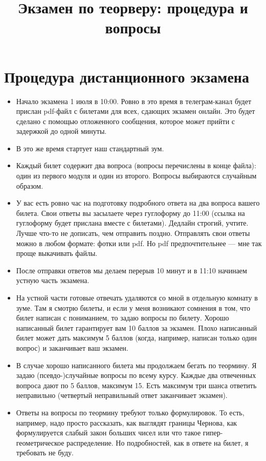 \documentclass[12pt]{article}
\title{Экзамен по теорверу: процедура и вопросы}
\begin{document}
\maketitle

\section*{Процедура дистанционного экзамена}

\begin{itemize}
  \item Начало экзамена 1 июля в 10:00. Ровно в это время в телеграм-канал будет прислан pdf-файл с билетами для всех, сдающих экзамен онлайн. Это будет сделано с помощью отложенного сообщения, которое может прийти с задержкой до одной минуты.
  \item В это же время стартует наш стандартный зум.
  \item Каждый билет содержит два вопроса (вопросы перечислены в конце файла): один из первого модуля и один из второго. Вопросы выбираются случайным образом.
  \item У вас есть ровно час на подготовку подробного ответа на два вопроса вашего билета. Свои ответы вы засылаете через гуглоформу до 11:00 (ссылка на гуглоформу будет прислана вместе с билетами). Дедлайн строгий, учтите. Лучше что-то не дописать, чем отправить поздно. Отправлять свои ответы можно в любом формате: фотки или pdf. Но pdf предпочтительнее --- мне так проще выкачивать файлы.
  \item После отправки ответов мы делаем перерыв 10 минут и в 11:10 начинаем устную часть экзамена.
  \item На устной части готовые отвечать удаляются со мной в отдельную комнату в зуме. Там я смотрю билеты, и если у меня возникают сомнения в том, что билет написан с пониманием, то задаю вопросы по билету. Хорошо написанный билет гарантирует вам 10 баллов за экзамен. Плохо написанный билет может дать максимум 5 баллов (когда, например, написан только один вопрос) и заканчивает ваш экзамен.
  \item В случае хорошо написанного билета мы продолжаем бегать по теормину. Я задаю (псевдо-)случайные вопросы по всему курсу. Каждые два отвеченных вопроса дают по 5 баллов, максимум 15. Есть максимум три шанса ответить неправильно (четвертый неправильный ответ заканчивает экзамен).
  \item Ответы на вопросы по теормину требуют только формулировок. То есть, например, надо просто рассказать, как выглядят границы Чернова, как формулируется слабый закон больших чисел или что такое гипер-геометрическое распределение. Но подробностей, как в ответе на билет, я требовать не буду.

\end{itemize}
\end{document}
